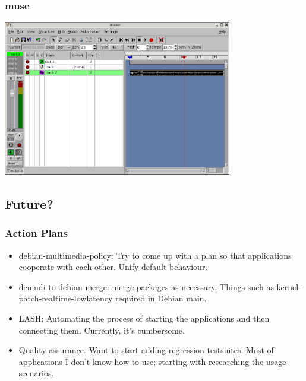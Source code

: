 \documentclass[dvipdfm]{beamer}
\begin{document}
\begin{frame}
 \frametitle{muse}
\includegraphics[width=10cm]{image200602/muse.png}
\end{frame}

 \subsection{Future?}
\begin{frame}
 \frametitle{Action Plans}
\begin{itemize}
 \item debian-multimedia-policy: Try to come up with a plan so that
       applications cooperate with each other. Unify default behaviour.
 \item demudi-to-debian merge: merge packages as necessary.
       Things such as kernel-patch-realtime-lowlatency required in
       Debian main.
 \item LASH: Automating the process of starting the applications and
       then connecting them. Currently, it's cumbersome.
 \item Quality assurance. 
       Want to start adding regression testsuites.
       Most of applications I don't know how to use; starting with researching
       the usage scenarios.
\end{itemize}

\end{frame}
\end{document}
